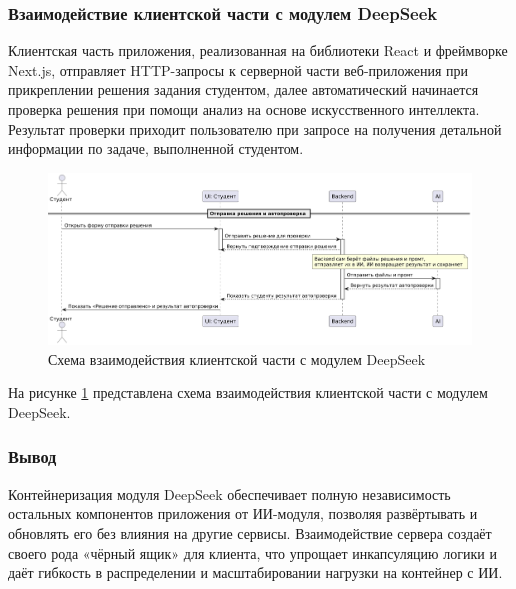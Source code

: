 \subsubsection{Взаимодействие клиентской части с модулем DeepSeek}

Клиентская часть приложения, реализованная на библиотеки React и фреймворке Next.js, отправляет HTTP-запросы к серверной части веб-приложения при прикреплении решения задания студентом, далее автоматический начинается проверка решения при помощи анализ на основе искусственного интеллекта. Результат проверки приходит пользователю при запросе на получения детальной информации по задаче, выполненной студентом.

\begin{figure}[h]
    \centering
    \includegraphics[width=0.8\linewidth]{static/diagrams/TaskSendStudentDiagram.png}
    \caption{Схема взаимодействия клиентской части с модулем DeepSeek}
    \label{fig:client-deepseek}
\end{figure}

На рисунке \ref{fig:client-deepseek} представлена схема взаимодействия клиентской части с модулем DeepSeek.

\subsubsection{Вывод}

Контейнеризация модуля DeepSeek обеспечивает полную независимость остальных компонентов приложения от ИИ-модуля, позволяя развёртывать и обновлять его без влияния на другие сервисы. Взаимодействие сервера создаёт своего рода «чёрный ящик» для клиента, что упрощает инкапсуляцию логики и даёт гибкость в распределении и масштабировании нагрузки на контейнер с ИИ.


